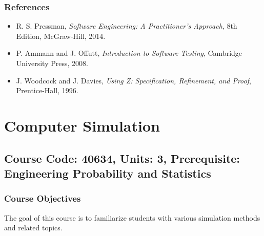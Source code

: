 \documentclass[12pt]{article}
\begin{document}
\subsubsection*{References}
\begin{itemize}
    \item R. S. Pressman, \textit{Software Engineering: A Practitioner’s Approach}, 8th Edition, McGraw-Hill, 2014.
    \item P. Ammann and J. Offutt, \textit{Introduction to Software Testing}, Cambridge University Press, 2008.
    \item J. Woodcock and J. Davies, \textit{Using Z: Specification, Refinement, and Proof}, Prentice-Hall, 1996.
\end{itemize}

\newpage

\section{Computer Simulation}
\subsection*{Course Code: 40634, Units: 3, Prerequisite: Engineering Probability and Statistics}

\subsubsection*{Course Objectives}
The goal of this course is to familiarize students with various simulation methods and related topics.
\end{document}

